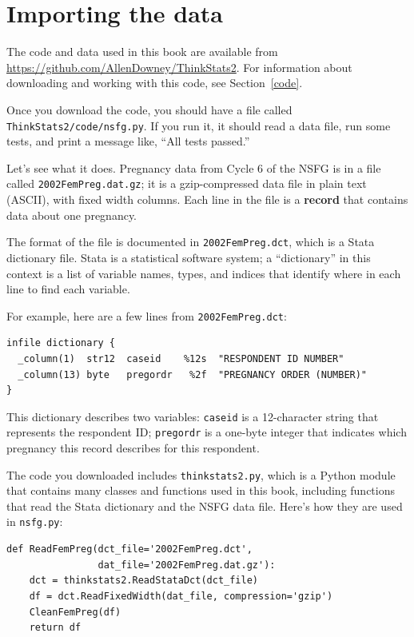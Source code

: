 \documentclass[12pt]{book}
\begin{document}
\section{Importing the data}

The code and data used in this book are available from
\url{https://github.com/AllenDowney/ThinkStats2}.  For information
about downloading and working with this code, 
see Section~\ref{code}.

Once you download the code, you should have a file called {\tt
  ThinkStats2/code/nsfg.py}.  If you run it, it should read a data
file, run some tests, and print a message like, ``All tests passed.''

Let's see what it does.  Pregnancy data from Cycle 6 of the NSFG is in
a file called {\tt 2002FemPreg.dat.gz}; it
is a gzip-compressed data file in plain text (ASCII), with fixed width
columns.  Each line in the file is a {\bf record} that
contains data about one pregnancy.

The format of the file is documented in {\tt 2002FemPreg.dct}, which
is a Stata dictionary file.  Stata is a statistical software system;
a ``dictionary'' in this context is a list of variable names, types,
and indices that identify where in each line to find each variable.

For example, here are a few lines from {\tt 2002FemPreg.dct}:
%
\begin{verbatim}
infile dictionary {
  _column(1)  str12  caseid    %12s  "RESPONDENT ID NUMBER"
  _column(13) byte   pregordr   %2f  "PREGNANCY ORDER (NUMBER)"
}
\end{verbatim}

This dictionary describes two variables: {\tt caseid} is a 12-character
string that represents the respondent ID; {\tt pregordr} is a 
one-byte integer that indicates which pregnancy this record
describes for this respondent.

The code you downloaded includes {\tt thinkstats2.py}, which is a Python
module
that contains many classes and functions used in this book,
including functions that read the Stata dictionary and
the NSFG data file.  Here's how they are used in {\tt nsfg.py}:

\begin{verbatim}
def ReadFemPreg(dct_file='2002FemPreg.dct',
                dat_file='2002FemPreg.dat.gz'):
    dct = thinkstats2.ReadStataDct(dct_file)
    df = dct.ReadFixedWidth(dat_file, compression='gzip')
    CleanFemPreg(df)
    return df
\end{verbatim}
\end{document}
